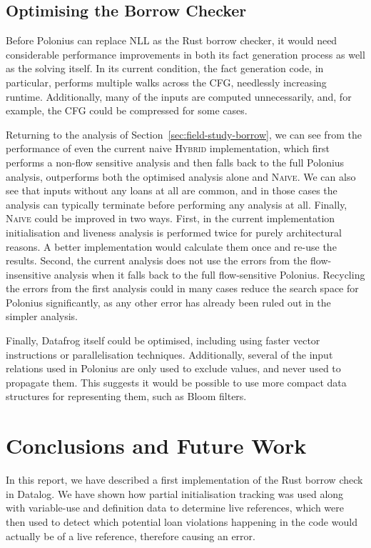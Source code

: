 \documentclass[11pt,a4paper,twoside,openany,draft]{report}
\begin{document}
\section{Optimising the Borrow Checker}\label{sec:optim-borr-check}

Before Polonius can replace NLL as the Rust borrow checker, it would need
considerable performance improvements in both its fact generation process as
well as the solving itself. In its current condition, the fact generation code,
in particular, performs multiple walks across the CFG, needlessly increasing
runtime. Additionally, many of the inputs are computed unnecessarily, and, for
example, the CFG could be compressed for some cases.

Returning to the analysis of Section~\ref{sec:field-study-borrow}, we can see
from the performance of even the current naive \textsc{Hybrid} implementation,
which first performs a non-flow sensitive analysis and then falls back to the
full Polonius analysis, outperforms both the optimised analysis alone and
\textsc{Naive}. We can also see that inputs without any loans at all are common,
and in those cases the analysis can typically terminate before performing any
analysis at all. Finally, \textsc{Naive} could be improved in two ways. First,
in the current implementation initialisation and liveness analysis is performed
twice for purely architectural reasons. A better implementation would calculate
them once and re-use the results. Second, the current analysis does not use the
errors from the flow-insensitive analysis when it falls back to the full
flow-sensitive Polonius. Recycling the errors from the first analysis could in
many cases reduce the search space for Polonius significantly, as any other
error has already been ruled out in the simpler analysis.

Finally, Datafrog itself could be optimised, including using faster vector
instructions or parallelisation techniques. Additionally, several of the input
relations used in Polonius are only used to exclude values, and never used to
propagate them. This suggests it would be possible to use more compact data
structures for representing them, such as Bloom filters.

\chapter{Conclusions and Future Work}\label{cha:conclusions}

In this report, we have described a first implementation of the Rust borrow
check in Datalog. We have shown how partial initialisation tracking was used
along with variable-use and definition data to determine live references, which
were then used to detect which potential loan violations happening in the code
would actually be of a live reference, therefore causing an error.
\end{document}
